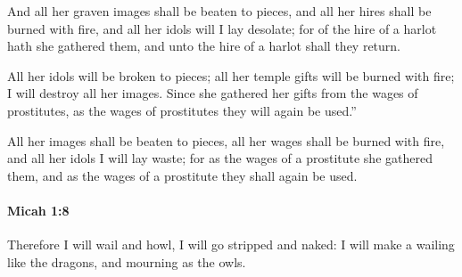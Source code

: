 			\begin{versebox}
					\item[BHS] 
					\item[LXX] 
					\item[ASV] And all her graven images shall be beaten to pieces, and all her hires shall be burned with fire, and all her idols will I lay desolate; for of the hire of a harlot hath she gathered them, and unto the hire of a harlot shall they return.
					\item[NIV] All her idols will be broken to pieces; all her temple gifts will be burned with fire; I will destroy all her images. Since she gathered her gifts from the wages of prostitutes, as the wages of prostitutes they will again be used.”
					\item[NRSV] All her images shall be beaten to pieces, all her wages shall be burned with fire, and all her idols I will lay waste; for as the wages of a prostitute she gathered them, and as the wages of a prostitute they shall again be used.
			\end{versebox}

		\paragraph{Micah 1:8} %
			\label{MICAH-1-8}

			Therefore I will wail and howl, I will go stripped and naked: I will make a wailing like the dragons, and mourning as the owls.

